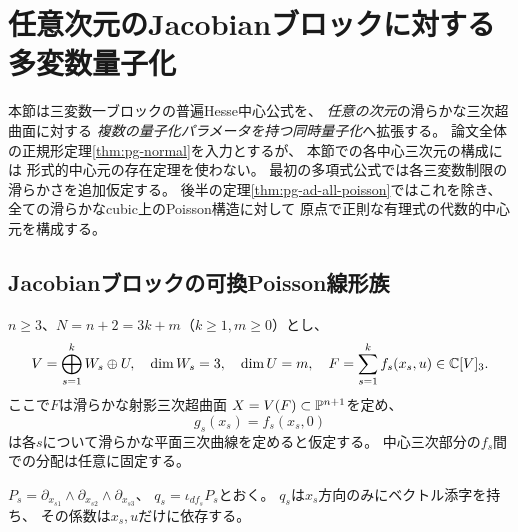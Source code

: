 \section{任意次元のJacobianブロックに対する多変数量子化}
\label{sec:pg-all-dimensions}
本節は三変数一ブロックの普遍Hesse中心公式を、
\emph{任意の次元}の滑らかな三次超曲面に対する
\emph{複数の量子化パラメータを持つ同時量子化}へ拡張する。
論文全体の正規形定理\ref{thm:pg-normal}を入力とするが、
本節での各中心三次元の構成には
形式的中心元の存在定理を使わない。
最初の多項式公式では各三変数制限の滑らかさを追加仮定する。
後半の定理\ref{thm:pg-ad-all-poisson}ではこれを除き、
全ての滑らかなcubic上のPoisson構造に対して
原点で正則な有理式の代数的中心元を構成する。

\subsection{Jacobianブロックの可換Poisson線形族}
$n\ge3$、$N=n+2=3k+m$（$k\ge1,m\ge0$）とし、
\begin{equation}
 V=\bigoplus_{s=1}^{k}W_s\oplus U,\quad
 \dim W_s=3,\quad\dim U=m,\quad
 F=\sum_{s=1}^k f_s(x_s,u)\in\mathbb C[V]_3.
 \label{eq:pg-ad-normal}
\end{equation}
ここで$F$は滑らかな射影三次超曲面
$X=V(F)\subset\mathbb P^{n+1}$を定め、
\begin{equation}
 g_s(x_s)=f_s(x_s,0)
 \label{eq:pg-ad-smooth}
\end{equation}
は各$s$について滑らかな平面三次曲線を定めると仮定する。
中心三次部分の$f_s$間での分配は任意に固定する。

$P_s=\partial_{x_{s1}}\wedge\partial_{x_{s2}}
\wedge\partial_{x_{s3}}$、
$q_s=\iota_{df_s}P_s$とおく。
$q_s$は$x_s$方向のみにベクトル添字を持ち、
その係数は$x_s,u$だけに依存する。

